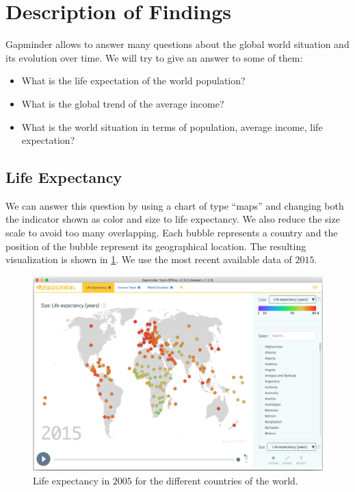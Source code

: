 \section{Description of Findings}
\label{sec:findings}

Gapminder allows to answer many questions about the global world situation and its evolution over time.
We will try to give an answer to some of them:
\begin{itemize}
    \item What is the life expectation of the world population?
    \item What is the global trend of the average income?    
    \item What is the world situation in terms of population, average income, life expectation?
\end{itemize}


\subsection{Life Expectancy}
We can answer this question by using a chart of type ``maps'' and changing both the indicator shown as color and size to life expectancy.
We also reduce the size scale to avoid too many overlapping.
Each bubble represents a country and the position of the bubble represent its geographical location.
The resulting visualization is shown in \cref{fig:life-expectation}.
We use the most recent available data of $2015$.

\begin{figure}[h]
	\centering
	\includegraphics[width=0.95\columnwidth]{figures/life-expectancy}
	\caption{Life expectancy in $2005$ for the different countries of the world.}
	\label{fig:life-expectation}
\end{figure}

